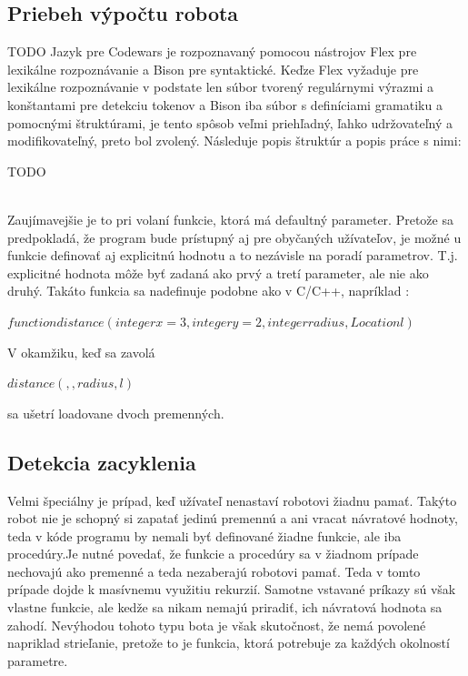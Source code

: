 \subsection{Priebeh výpočtu robota} %
TODO
Jazyk pre Codewars je rozpoznavaný pomocou nástrojov Flex pre lexikálne rozpoznávanie a Bison pre syntaktické. Keďze Flex vyžaduje pre lexikálne rozpoznávanie v podstate len súbor tvorený regulárnymi výrazmi a konštantami pre detekciu tokenov a Bison iba súbor s definíciami gramatiku a pomocnými štruktúrami, je tento spôsob veľmi priehľadný, ľahko udržovateľný a modifikovateľný, preto bol zvolený. Následuje popis štruktúr  a popis práce s nimi:
\begin{huge}TODO \end{huge}
\\
Zaujímavejšie je to pri volaní funkcie, ktorá má defaultný parameter. Pretože sa predpokladá, že program bude prístupný aj pre obyčaných užívateľov, je možné u funkcie definovať aj explicitnú hodnotu a to nezávisle na poradí parametrov. T.j. explicitné hodnota môže byť zadaná ako prvý a tretí parameter, ale nie ako druhý. Takáto funkcia sa nadefinuje podobne ako v C/C++, napríklad : \\\begin{center} $ function distance(integer x=3, integer y=2, integer radius, Location l) $ \\\end{center}V okamžiku, keď sa zavolá \begin{center} $ distance(, , radius,l) $ \end{center} sa ušetrí loadovane dvoch premenných.
\subsection{Detekcia zacyklenia}

Velmi špeciálny je prípad, keď užívateľ nenastaví robotovi žiadnu pamať. Takýto robot nie je schopný si zapatať jedinú premennú a ani vracat návratové hodnoty, teda v kóde programu by nemali byť definované žiadne funkcie, ale iba procedúry.Je nutné povedať, že funkcie a procedúry sa v žiadnom prípade nechovajú ako premenné a teda nezaberajú robotovi pamať. Teda v tomto prípade dojde k masívnemu využitiu rekurzií. Samotne vstavané príkazy sú však vlastne funkcie, ale kedže sa nikam nemajú priradiť, ich návratová hodnota sa zahodí. Nevýhodou tohoto typu bota je však skutočnost, že nemá povolené napriklad strieľanie, pretože to je funkcia, ktorá potrebuje za každých okolností parametre.
